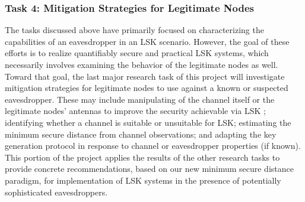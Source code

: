 \documentclass[12pt, titlepage]{article}
\begin{document}
\subsubsection*{Task 4: Mitigation Strategies for Legitimate Nodes}
The tasks discussed above have primarily focused on characterizing the capabilities of an eavesdropper in an LSK scenario.  However, the goal of these efforts is to realize quantifiably secure and practical LSK systems, which necessarily involves examining the behavior of the legitimate nodes as well.  Toward that goal, the last major research task of this project will investigate mitigation strategies for legitimate nodes to use against a known or suspected eavesdropper.  These may include manipulating of the channel itself or the legitimate nodes' antennas to improve the security achievable via LSK \cite{chen2011, mehmood2015}; identifying whether a channel is suitable or unsuitable for LSK; estimating the minimum secure distance from channel observations; and adapting the key generation protocol in response to channel or eavesdropper properties (if known).  This portion of the project applies the results of the other research tasks to provide concrete recommendations, based on our new minimum secure distance paradigm, for implementation of LSK systems in the presence of potentially sophisticated eavesdroppers.
\end{document}
